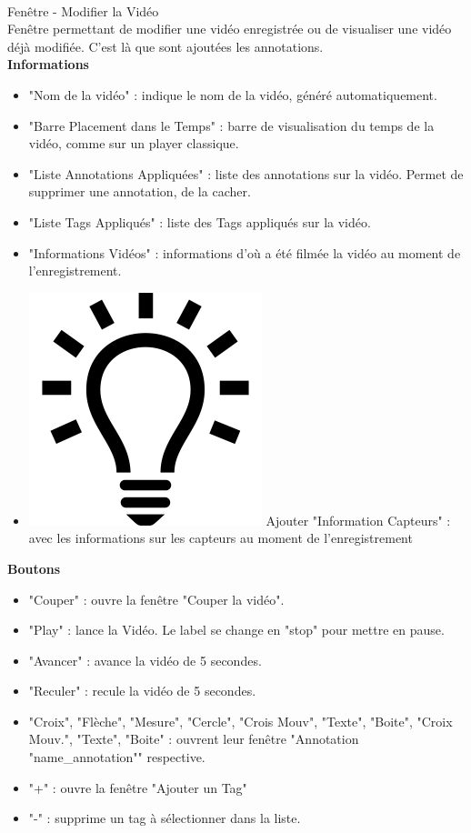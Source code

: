 \documentclass[11pt,french,a4paper]{report}
\begin{document}
\dotfill \\

\Large Fenêtre - Modifier la Vidéo\normalsize \\
    Fenêtre permettant de modifier une vidéo enregistrée ou de visualiser une vidéo déjà modifiée.
    C'est là que sont ajoutées les annotations. \\
\large \textbf{Informations}\normalsize
     \begin{itemize}[label=, leftmargin=*,parsep=0cm,itemsep=0cm,topsep=0cm]
        \item "Nom de la vidéo" : indique le nom de la vidéo, généré automatiquement.
        \item "Barre Placement dans le Temps" : barre de visualisation du temps de la vidéo, comme sur un player classique.
        \item "Liste Annotations Appliquées" : liste des annotations sur la vidéo. Permet de supprimer une annotation, de
        la cacher.
        \item "Liste Tags Appliqués" : liste des Tags appliqués sur la vidéo.
        \item "Informations Vidéos" : informations d'où a été filmée la vidéo au moment de l'enregistrement.
        \item \includegraphics[scale=0.05]{../images/logo/logo_ampoule} Ajouter "Information Capteurs" :
            avec les informations sur les capteurs au moment de l'enregistrement 
    \end{itemize}    
\large \textbf{Boutons}\normalsize
     \begin{itemize}[label=, leftmargin=*,parsep=0cm,itemsep=0cm,topsep=0cm]
        \item "Couper" : ouvre la fenêtre "Couper la vidéo".
        \item "Play" : lance la Vidéo. Le label se change en "stop" pour mettre en pause.
        \item "Avancer" : avance la vidéo de 5 secondes.
        \item "Reculer" : recule la vidéo de 5 secondes.
        \item "Croix", "Flèche", "Mesure", "Cercle", "Crois Mouv", "Texte", "Boite", "Croix Mouv.", "Texte", "Boite" : ouvrent
        leur fenêtre "Annotation "name\_annotation"" respective.
        \item "+" : ouvre la fenêtre "Ajouter un Tag"
        \item "-" : supprime un tag à sélectionner dans la liste.
    \end{itemize}
\end{document}
